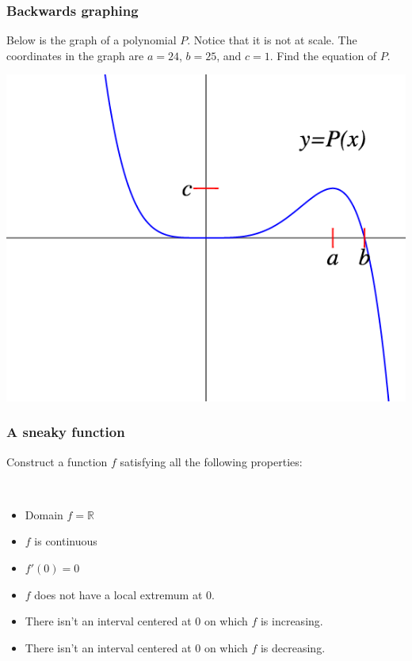 \documentclass[14pt]{beamer}
\newcommand {\DS} [1] {${\displaystyle #1}$}
\newcommand {\R}{\mathbb{R}}
\begin{document}
\begin{frame}[t]
\frametitle{Backwards graphing}

Below is the graph of a polynomial $P$.  Notice that it is not at scale.   The coordinates in the graph are $a=24$, $b=25$, and $c=1$.  Find the equation of $P$.

	\begin{center}
	\includegraphics[scale=.38]{G18}
	\end{center}

\end{frame}

\begin{frame}[t]
\frametitle{A sneaky function}

Construct a function $f$ satisfying all the following properties:

\

	\begin{itemize}
		\item  Domain \DS{f = \R}
		\item $f$ is continuous
		\item $f'(0)=0$
		\item $f$ does not have a local extremum at $0$.
		\item  There isn't an interval centered at $0$ on which $f$ is increasing.
		\item  There isn't an interval centered at $0$ on which $f$ is decreasing.
	\end{itemize}


\end{frame}

\end{document}
